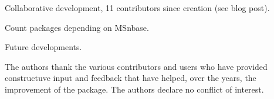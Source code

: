 \documentclass[journal=jacsat,manuscript=article]{achemso}
\begin{document}
Collaborative development, 11 contributors since creation (see blog
post).

Count packages depending on MSnbase.

Future developments.


\begin{acknowledgement}

The authors thank the various contributors and users who have provided
constructuve input and feedback that have helped, over the years, the
improvement of the package. The authors declare no conflict of
interest.

\end{acknowledgement}






\end{document}
